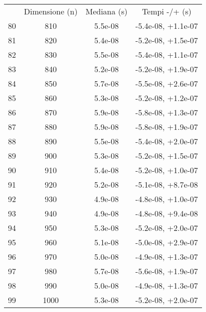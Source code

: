\begin{table}
\centering
\begin{adjustbox}{width=1\textwidth/2}
\begin{tabular}{|c|c|c|c|}
\hline
 & Dimensione (n) & Mediana (s) & Tempi -/+ (s) \\
80 & 810 & 5.5e-08 & -5.4e-08, +1.1e-07 \\
\cline{1-4}
81 & 820 & 5.4e-08 & -5.2e-08, +1.5e-07 \\
\cline{1-4}
82 & 830 & 5.5e-08 & -5.4e-08, +1.1e-07 \\
\cline{1-4}
83 & 840 & 5.2e-08 & -5.2e-08, +1.9e-07 \\
\cline{1-4}
84 & 850 & 5.7e-08 & -5.5e-08, +2.6e-07 \\
\cline{1-4}
85 & 860 & 5.3e-08 & -5.2e-08, +1.2e-07 \\
\cline{1-4}
86 & 870 & 5.9e-08 & -5.8e-08, +1.3e-07 \\
\cline{1-4}
87 & 880 & 5.9e-08 & -5.8e-08, +1.9e-07 \\
\cline{1-4}
88 & 890 & 5.5e-08 & -5.4e-08, +2.0e-07 \\
\cline{1-4}
89 & 900 & 5.3e-08 & -5.2e-08, +1.5e-07 \\
\cline{1-4}
90 & 910 & 5.4e-08 & -5.2e-08, +1.0e-07 \\
\cline{1-4}
91 & 920 & 5.2e-08 & -5.1e-08, +8.7e-08 \\
\cline{1-4}
92 & 930 & 4.9e-08 & -4.8e-08, +1.0e-07 \\
\cline{1-4}
93 & 940 & 4.9e-08 & -4.8e-08, +9.4e-08 \\
\cline{1-4}
94 & 950 & 5.3e-08 & -5.2e-08, +2.0e-07 \\
\cline{1-4}
95 & 960 & 5.1e-08 & -5.0e-08, +2.9e-07 \\
\cline{1-4}
96 & 970 & 5.0e-08 & -4.9e-08, +1.3e-07 \\
\cline{1-4}
97 & 980 & 5.7e-08 & -5.6e-08, +1.9e-07 \\
\cline{1-4}
98 & 990 & 5.0e-08 & -4.9e-08, +1.3e-07 \\
\cline{1-4}
99 & 1000 & 5.3e-08 & -5.2e-08, +2.0e-07 \\
\cline{1-4}
\end{tabular}
\end{adjustbox}
\end{table}
